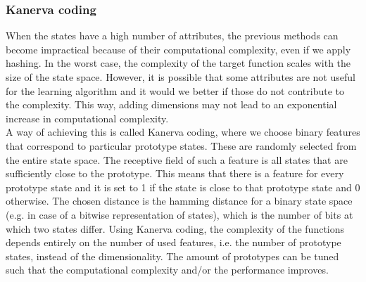 \documentclass[a4paper, 11pt]{article}
\begin{document}
\subsubsection{Kanerva coding}
\label{subs:rl_kc}
When the states have a high number of attributes, the previous methods can become impractical because of their computational complexity, even if we apply hashing. In the worst case, the complexity of the target function scales with the size of the state space. However, it is possible that some attributes are not useful for the learning algorithm and it would we better if those do not contribute to the complexity. This way, adding dimensions may not lead to an exponential increase in computational complexity.\\
A way of achieving this is called Kanerva coding, where we choose binary features that correspond to particular prototype states. These are randomly selected from the entire state space. The receptive field of such a feature is all states that are sufficiently close to the prototype. This means that there is a feature for every prototype state and it is set to 1 if the state is close to that prototype state and 0 otherwise. The chosen distance is the hamming distance for a binary state space (e.g. in case of a bitwise representation of states), which is the number of bits at which two states differ.
Using Kanerva coding, the complexity of the functions depends entirely on the number of used features, i.e. the number of prototype states, instead of the dimensionality. The amount of prototypes can be tuned such that the computational complexity and/or the performance improves.\\
\end{document}
